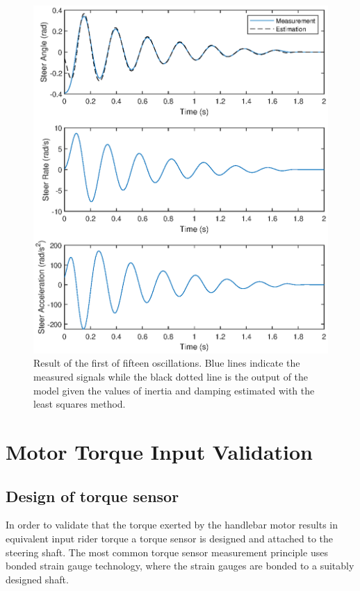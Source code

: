 \begin{figure}[h]
\centering
\captionsetup{justification=centering,margin=2cm}

\includegraphics[scale=0.8]{images/figure3.eps}
	\caption[Short title]{Result of the first of fifteen oscillations. Blue lines indicate the  measured signals while the black dotted line is the output of the model given the values of inertia and damping estimated with the least squares method.}
\label{fig:figure3}
\end{figure}


\newpage
\section{Motor Torque Input Validation} \label{sec:torqueSensor}

\subsection{Design of torque sensor}
In order to validate that the torque exerted by the handlebar motor results in equivalent input rider torque  a torque sensor is designed and attached to the steering shaft. The most common torque sensor measurement principle uses bonded strain gauge technology, where the strain gauges are bonded to a suitably designed shaft.

